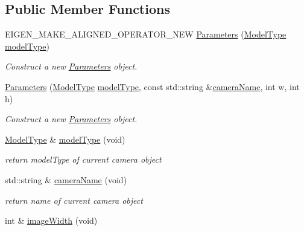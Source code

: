 \subsection*{Public Member Functions}
\begin{DoxyCompactItemize}
\item 
E\+I\+G\+E\+N\+\_\+\+M\+A\+K\+E\+\_\+\+A\+L\+I\+G\+N\+E\+D\+\_\+\+O\+P\+E\+R\+A\+T\+O\+R\+\_\+\+N\+EW \hyperlink{classcamodocal_1_1Camera_1_1Parameters_ab772f3921cda90a7860596b7495eb83c}{Parameters} (\hyperlink{classcamodocal_1_1Camera_a663bb19b7b1f38f6d1b7eeb0890183ff}{Model\+Type} \hyperlink{classcamodocal_1_1Camera_1_1Parameters_aab8170228d7e26e10b231c5960d5ddf7}{model\+Type})
\begin{DoxyCompactList}\small\item\em Construct a new \hyperlink{classcamodocal_1_1Camera_1_1Parameters}{Parameters} object. \end{DoxyCompactList}\item 
\hyperlink{classcamodocal_1_1Camera_1_1Parameters_ab729d4ad394ff16d115c6ce78ab77a95}{Parameters} (\hyperlink{classcamodocal_1_1Camera_a663bb19b7b1f38f6d1b7eeb0890183ff}{Model\+Type} \hyperlink{classcamodocal_1_1Camera_1_1Parameters_aab8170228d7e26e10b231c5960d5ddf7}{model\+Type}, const std\+::string \&\hyperlink{classcamodocal_1_1Camera_1_1Parameters_ad5d799e6367c5605907a941b2271e271}{camera\+Name}, int w, int h)
\begin{DoxyCompactList}\small\item\em Construct a new \hyperlink{classcamodocal_1_1Camera_1_1Parameters}{Parameters} object. \end{DoxyCompactList}\item 
\hyperlink{classcamodocal_1_1Camera_a663bb19b7b1f38f6d1b7eeb0890183ff}{Model\+Type} \& \hyperlink{classcamodocal_1_1Camera_1_1Parameters_aab8170228d7e26e10b231c5960d5ddf7}{model\+Type} (void)
\begin{DoxyCompactList}\small\item\em return model\+Type of current camera object \end{DoxyCompactList}\item 
std\+::string \& \hyperlink{classcamodocal_1_1Camera_1_1Parameters_ad5d799e6367c5605907a941b2271e271}{camera\+Name} (void)
\begin{DoxyCompactList}\small\item\em return name of current camera object \end{DoxyCompactList}\item 
int \& \hyperlink{classcamodocal_1_1Camera_1_1Parameters_a92c11d296cb64c91a0c15528a8a7b813}{image\+Width} (void)

\end{DoxyCompactItemize}
